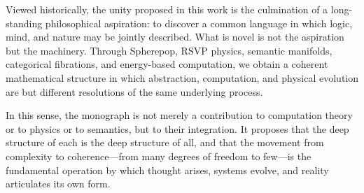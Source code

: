 \documentclass[12pt,letterpaper]{article}
\begin{document}
Viewed historically, the unity proposed in this work is the culmination of a 
long-standing philosophical aspiration: to discover a common language in which 
logic, mind, and nature may be jointly described.  What is novel is not the 
aspiration but the machinery.  Through Spherepop, RSVP physics, semantic 
manifolds, categorical fibrations, and energy-based computation, we obtain a 
coherent mathematical structure in which abstraction, computation, and physical 
evolution are but different resolutions of the same underlying process.

In this sense, the monograph is not merely a contribution to computation theory 
or to physics or to semantics, but to their integration.  It proposes that the 
deep structure of each is the deep structure of all, and that the movement from 
complexity to coherence---from many degrees of freedom to few---is the 
fundamental operation by which thought arises, systems evolve, and reality 
articulates its own form.
\end{document}

